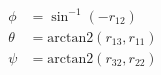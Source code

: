 \documentclass{article}
\begin{document}
\begin{align}
  \phi &= \sin^{-1}(-r_{12}) \\
  \theta &= \text{arctan2}(r_{13}, r_{11}) \\
  \psi &= \text{arctan2}(r_{32}, r_{22})
\end{align}
\newpage
\end{document}
